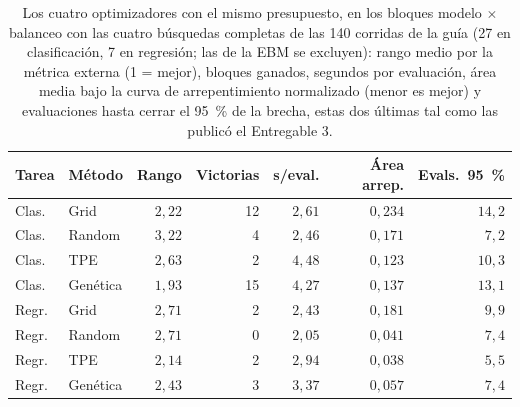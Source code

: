 \begin{table}[tbp]
  \centering\small\setlength{\tabcolsep}{3pt}
  \caption{Los cuatro optimizadores con el mismo presupuesto, en los bloques modelo $\times$ balanceo con las cuatro búsquedas completas de las 140 corridas de la guía (27 en clasificación, 7 en regresión; las de la EBM se excluyen): rango medio por la métrica externa (1 = mejor), bloques ganados, segundos por evaluación, área media bajo la curva de arrepentimiento normalizado (menor es mejor) y evaluaciones hasta cerrar el 95~\% de la brecha, estas dos últimas tal como las publicó el Entregable 3.}
  \label{tab:optimizadores}
  \begin{tabular}{@{}l l r r r r r@{}}
    \toprule
    Tarea & Método & Rango & Victorias & s/eval. & Área arrep. & Evals.\ 95~\% \\
    \midrule
    Clas. & Grid & $2{,}22$ & 12 & $2{,}61$ & $0{,}234$ & $14{,}2$ \\
    Clas. & Random & $3{,}22$ & 4 & $2{,}46$ & $0{,}171$ & $7{,}2$ \\
    Clas. & TPE & $2{,}63$ & 2 & $4{,}48$ & $0{,}123$ & $10{,}3$ \\
    Clas. & Genética & $1{,}93$ & 15 & $4{,}27$ & $0{,}137$ & $13{,}1$ \\
    \midrule
    Regr. & Grid & $2{,}71$ & 2 & $2{,}43$ & $0{,}181$ & $9{,}9$ \\
    Regr. & Random & $2{,}71$ & 0 & $2{,}05$ & $0{,}041$ & $7{,}4$ \\
    Regr. & TPE & $2{,}14$ & 2 & $2{,}94$ & $0{,}038$ & $5{,}5$ \\
    Regr. & Genética & $2{,}43$ & 3 & $3{,}37$ & $0{,}057$ & $7{,}4$ \\
    \bottomrule
  \end{tabular}
\end{table}
